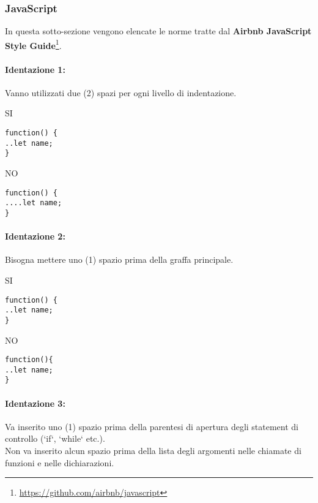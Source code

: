 \documentclass[../processi_primari.tex]{subfiles}
\begin{document}
	
	\subsubsection{JavaScript}
	In questa sotto-sezione vengono elencate le norme tratte dal \textbf{Airbnb JavaScript Style Guide}\footnote{\href{https://github.com/airbnb/javascript}{https://github.com/airbnb/javascript}}.
	
	\paragraph*{Identazione 1: }
	Vanno utilizzati due (2) spazi per ogni livello di indentazione.
	
	\begin{minipage}{6cm}
		{\begin{center}SI\end{center}}
		\begin{Verbatim}[frame=single]
function() {
..let name;
}
		\end{Verbatim}
	\end{minipage}
	\hfill
	\begin{minipage}{6cm}
		{\begin{center}NO\end{center}}
		\begin{Verbatim}[frame=single]
function() {
....let name;
}
		\end{Verbatim}
	\end{minipage}
	
	\paragraph*{Identazione 2: }
	Bisogna mettere uno (1) spazio prima della graffa principale.
		
	\begin{minipage}{6cm}
		{\begin{center}SI\end{center}}
		\begin{Verbatim}[frame=single]
function() {
..let name;
}
		\end{Verbatim}
	\end{minipage}
	\hfill
	\begin{minipage}{6cm}
		{\begin{center}NO\end{center}}
		\begin{Verbatim}[frame=single]
function(){
..let name;
}
		\end{Verbatim}
	\end{minipage}	\paragraph*{Identazione 3: }
Va inserito uno (1) spazio prima della parentesi di apertura degli statement di controllo (`if`, `while` etc.). \\
Non va inserito alcun spazio prima della lista degli argomenti nelle chiamate di funzioni e nelle dichiarazioni.\\
\end{document}
